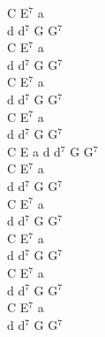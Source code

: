 \documentclass[a5paper, 10pt]{book}
\begin{document}
\begin{minipage}[t]{0.25\textwidth}
  C E$^7$ a\\
  d d$^7$ G G$^7$\\
  C E$^7$ a\\
  d d$^7$ G G$^7$\\C E$^7$ a\\
  d d$^7$ G G$^7$\\C E$^7$ a\\
  d d$^7$ G G$^7$\\

  C E a d d$^7$ G G$^7$\\
  C E$^7$ a\\
  d d$^7$ G G$^7$\\

  C E$^7$ a\\
  d d$^7$ G G$^7$\\
  C E$^7$ a\\
  d d$^7$ G G$^7$\\
  C E$^7$ a\\
  d d$^7$ G G$^7$\\
  C E$^7$ a\\
  d d$^7$ G G$^7$\\
\end{minipage}

\newpage
\end{document}
